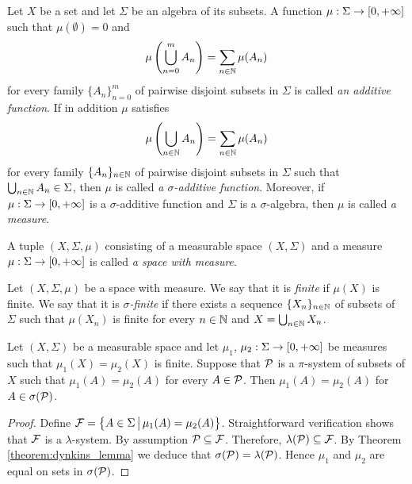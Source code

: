\begin{definition}
Let $X$ be a set and let $\Sigma$ be an algebra of its subsets. A function $\mu:\Sigma \rightarrow [0,+\infty]$ such that $\mu(\emptyset)=0$ and 
$$\mu\left(\bigcup_{n=0}^mA_n\right)=\sum_{n\in {\mathbb N}}\mu(A_n)$$
for every family  $\{A_n\}_{n=0}^m$ of pairwise disjoint subsets in $\Sigma$ is called \textit{an additive function}. If in addition $\mu$ satisfies
$$\mu\left(\bigcup_{n\in {\mathbb N}}A_n\right)=\sum_{n\in {\mathbb N}}\mu(A_n)$$
for every family  $\{A_n\}_{n\in {\mathbb N}}$ of pairwise disjoint subsets in $\Sigma$ such that $\bigcup_{n\in {\mathbb N}}A_n\in \Sigma$, then $\mu$ is called \textit{a $\sigma$-additive function}. Moreover, if $\mu:\Sigma \rightarrow [0,+\infty]$ is a $\sigma$-additive function and $\Sigma$ is a $\sigma$-algebra, then $\mu$ is called \textit{a measure}. 
\end{definition}

\begin{definition}
A tuple $(X,\Sigma,\mu)$ consisting of a measurable space $\left(X,\Sigma\right)$ and a measure $\mu:\Sigma \rightarrow [0,+\infty]$ is called \textit{a space with measure}.
\end{definition}

\begin{definition}
Let $(X,\Sigma,\mu)$ be a space with measure. We say that it is \textit{finite} if $\mu(X)$ is finite. We say that it is \textit{$\sigma$-finite} if there exists a sequence $\{X_n\}_{n\in {\mathbb N}}$ of subsets of $\Sigma$ such that $\mu(X_n)$ is finite for every $n\in {\mathbb N}$ and $X=\bigcup_{n\in {\mathbb N}}X_n$.
\end{definition}

\begin{theorem}\label{theorem:uniqueness_on_pi_system}
Let $(X,\Sigma)$ be a measurable space and let $\mu_1$, $\mu_2:\Sigma\rightarrow [0,+\infty]$ be measures such that $\mu_1(X)=\mu_2(X)$ is finite. Suppose that ${\mathcal P}$ is a $\pi$-system of subsets of $X$ such that $\mu_1(A)=\mu_2(A)$ for every $A\in {\mathcal P}$. Then $\mu_1(A) = \mu_2(A)$ for $A\in \sigma({\mathcal P})$.
\end{theorem}
\begin{proof}
Define ${\mathcal F} = \big\{A\in \Sigma\,\big|\,\mu_1(A)=\mu_2(A) \big\}$. Straightforward verification shows that ${\mathcal F}$ is a $\lambda$-system. By assumption ${\mathcal P} \subseteq {\mathcal F}$. Therefore, $\lambda({\mathcal P}) \subseteq {\mathcal F}$. By Theorem \ref{theorem:dynkins_lemma} we deduce that $\sigma({\mathcal P})=\lambda({\mathcal P})$. Hence $\mu_1$ and $\mu_2$ are equal on sets in $\sigma({\mathcal P})$.
\end{proof}

